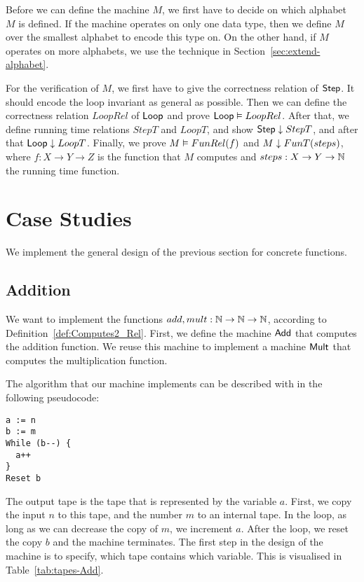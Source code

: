Before we can define the machine $M$, we first have to decide on which alphabet $M$ is defined.  If the machine operates on only one data type, then
we define $M$ over the smallest alphabet to encode this type on.  On the other hand, if $M$ operates on more alphabets, we use the technique in
Section~\ref{sec:extend-alphabet}.

For the verification of $M$, we first have to give the correctness relation of $\mathsf{Step}$.  It should encode the loop invariant as general as
possible.  Then we can define the correctness relation $LoopRel$ of $\mathsf{Loop}$ and prove $\mathsf{Loop} \mathrel{\vDash} LoopRel$.  After that, we define running time
relations $StepT$ and $LoopT$, and show $\mathsf{Step} \mathrel{\downarrow} StepT$, and after that $\mathsf{Loop} \mathrel{\downarrow} LoopT$.  Finally, we prove
$M \mathrel{\vDash} FunRel(f)$ and $M \mathrel{\downarrow} FunT(steps)$, where $f:X \to Y \to Z$ is the function that $M$ computes and $steps:X \rightarrow Y \rightarrow \mathbb{N}$ the
running time function.


\section{Case Studies}
\label{sec:case-studies}

We implement the general design of the previous section for concrete functions.

\subsection{Addition}
\label{sec:Add}
%

We want to implement the functions $add,mult:\mathbb{N}\rightarrow\mathbb{N}\rightarrow\mathbb{N}$, according to Definition~\ref{def:Computes2_Rel}.  First, we define the machine
$\mathsf{Add}$ that computes the addition function.  We reuse this machine to implement a machine $\mathsf{Mult}$ that computes the multiplication function.

The algorithm that our machine implements can be described with in the following pseudocode:
{
  \small
\begin{lstlisting}[style=pseudocode]
a := n
b := m
While (b--) {
  a++
}
Reset b
\end{lstlisting}
}%
The output tape is the tape that is represented by the variable $a$.  First, we copy the input $n$ to this tape, and the number $m$ to an internal
tape.  In the loop, as long as we can decrease the copy of $m$, we increment $a$.  After the loop, we reset the copy $b$ and the machine terminates.
The first step in the design of the machine is to specify, which tape contains which variable.  This is visualised in Table~\ref{tab:tapes-Add}.


